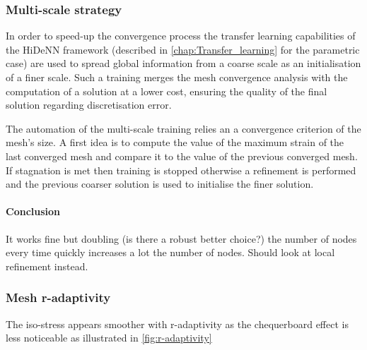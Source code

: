 \subsubsection{Multi-scale strategy}

In order to speed-up the convergence process the transfer learning capabilities of the HiDeNN framework (described in \cref{chap:Transfer_learning} for the parametric case) are used to spread global information from a coarse scale as an initialisation of a finer scale. Such a training merges the mesh convergence analysis with the computation of a solution at a lower cost, ensuring the quality of the final solution regarding discretisation error. 


The automation of the multi-scale training relies an a convergence criterion of the mesh's size. A first idea is to compute the value of the maximum strain of the last converged mesh and compare it to the value of the previous converged mesh. If stagnation is met then training is stopped otherwise a refinement is performed and the previous coarser solution is used to initialise the finer solution.

\paragraph{Conclusion} It works fine but doubling (is there a robust better choice?) the number of nodes every time quickly increases a lot the number of nodes. Should look at local refinement instead.

\subsubsection{Mesh r-adaptivity}


The iso-stress appears smoother with r-adaptivity as the chequerboard effect is less noticeable as illustrated in \cref{fig:r-adaptivity}

